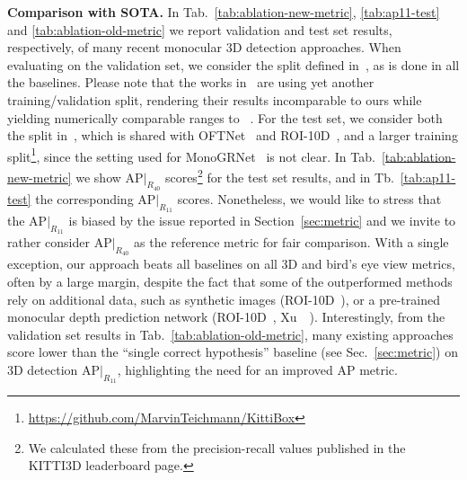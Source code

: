 \documentclass[10pt,twocolumn,letterpaper]{article}
\renewcommand{\paragraph}[1]{

        \vspace{3pt}
	\noindent\textbf{#1}}
\begin{document}
\paragraph{Comparison with SOTA.}
In Tab.~\ref{tab:ablation-new-metric}, \ref{tab:ap11-test} and \ref{tab:ablation-old-metric} we report validation and test set results, respectively, of many recent monocular 3D detection approaches.
When evaluating on the validation set, we consider the split defined in~\cite{NIPS2015_Chen}, as is done in all the baselines. Please note that the works in~\cite{Xiang_2015_CVPR,Mousavian_2017_CVPR,Xiang_2017_WACV} are using yet another training/validation split, rendering their results incomparable to ours while yielding numerically comparable ranges to \eg~\cite{Liu+19}.
For the test set, we consider both the split in~\cite{NIPS2015_Chen}, which is shared with OFTNet~\cite{Roddick18} and ROI-10D~\cite{Manhardt_2019_CVPR}, and a larger training split\footnote{\url{https://github.com/MarvinTeichmann/KittiBox}}, since the setting used for MonoGRNet~\cite{qin2019monogrnet} is not clear.
In Tab.~\ref{tab:ablation-new-metric} we show $\text{AP}|_{R_{40}}$ scores\footnote{We calculated these from the precision-recall values published in the KITTI3D leaderboard page.} for the test set results, and in Tb.~\ref{tab:ap11-test} the corresponding $\text{AP}|_{R_{11}}$ scores.
Nonetheless, we would like to stress that the $\text{AP}|_{R_{11}}$ is biased by the issue reported in Section~\ref{sec:metric} and we invite to rather consider $\text{AP}|_{R_{40}}$ as the reference metric for fair comparison.
With a single exception, our approach beats all baselines on all 3D and bird's eye view metrics, often by a large margin, despite the fact that
some of the outperformed methods rely on additional data, such as synthetic images (ROI-10D~\cite{Manhardt_2019_CVPR}), or a pre-trained monocular depth prediction network (ROI-10D~\cite{Manhardt_2019_CVPR}, Xu~\etal~\cite{Xu_2018_CVPR}).
Interestingly, from the validation set results in Tab.~\ref{tab:ablation-old-metric}, many existing approaches score lower than the ``single correct hypothesis'' baseline (see Sec.~\ref{sec:metric}) on 3D detection $\text{AP}|_{R_{11}}$, highlighting the need for an improved AP metric.
\newcommand{\gc}{0.9}
\end{document}
